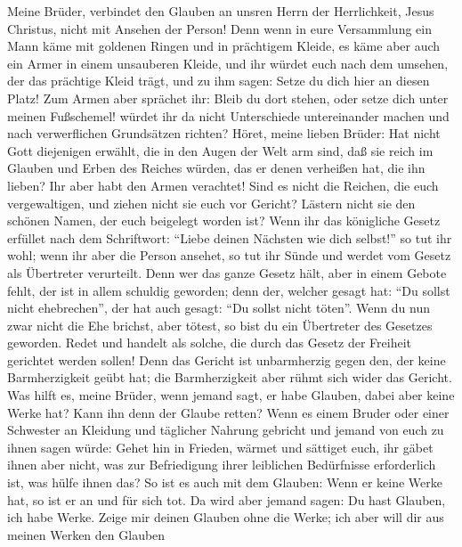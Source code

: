  Meine Brüder, verbindet den Glauben an unsren Herrn der
Herrlichkeit, Jesus Christus, nicht mit Ansehen der Person!
 Denn wenn in eure Versammlung ein Mann käme mit goldenen
Ringen und in prächtigem Kleide, es käme aber auch ein Armer in einem
unsauberen Kleide,  und ihr würdet euch nach dem umsehen,
der das prächtige Kleid trägt, und zu ihm sagen: Setze du dich hier an
diesen Platz! Zum Armen aber sprächet ihr: Bleib du dort stehen, oder
setze dich unter meinen Fußschemel!  würdet ihr da nicht
Unterschiede untereinander machen und nach verwerflichen Grundsätzen
richten?  Höret, meine lieben Brüder: Hat nicht Gott
diejenigen erwählt, die in den Augen der Welt arm sind, daß sie reich im
Glauben und Erben des Reiches würden, das er denen verheißen hat, die
ihn lieben?  Ihr aber habt den Armen verachtet! Sind es
nicht die Reichen, die euch vergewaltigen, und ziehen nicht sie euch vor
Gericht?  Lästern nicht sie den schönen Namen, der euch
beigelegt worden ist?  Wenn ihr das königliche Gesetz
erfüllet nach dem Schriftwort: ``Liebe deinen Nächsten wie dich
selbst!'' so tut ihr wohl;  wenn ihr aber die Person
ansehet, so tut ihr Sünde und werdet vom Gesetz als Übertreter
verurteilt.  Denn wer das ganze Gesetz hält, aber in
einem Gebote fehlt, der ist in allem schuldig geworden; 
denn der, welcher gesagt hat: ``Du sollst nicht ehebrechen'', der hat
auch gesagt: ``Du sollst nicht töten''. Wenn du nun zwar nicht die Ehe
brichst, aber tötest, so bist du ein Übertreter des Gesetzes geworden.
 Redet und handelt als solche, die durch das Gesetz der
Freiheit gerichtet werden sollen!  Denn das Gericht ist
unbarmherzig gegen den, der keine Barmherzigkeit geübt hat; die
Barmherzigkeit aber rühmt sich wider das Gericht.  Was
hilft es, meine Brüder, wenn jemand sagt, er habe Glauben, dabei aber
keine Werke hat? Kann ihn denn der Glaube retten?  Wenn
es einem Bruder oder einer Schwester an Kleidung und täglicher Nahrung
gebricht  und jemand von euch zu ihnen sagen würde: Gehet
hin in Frieden, wärmet und sättiget euch, ihr gäbet ihnen aber nicht,
was zur Befriedigung ihrer leiblichen Bedürfnisse erforderlich ist, was
hülfe ihnen das?  So ist es auch mit dem Glauben: Wenn er
keine Werke hat, so ist er an und für sich tot.  Da wird
aber jemand sagen: Du hast Glauben, ich habe Werke. Zeige mir deinen
Glauben ohne die Werke; ich aber will dir aus meinen Werken den Glauben
